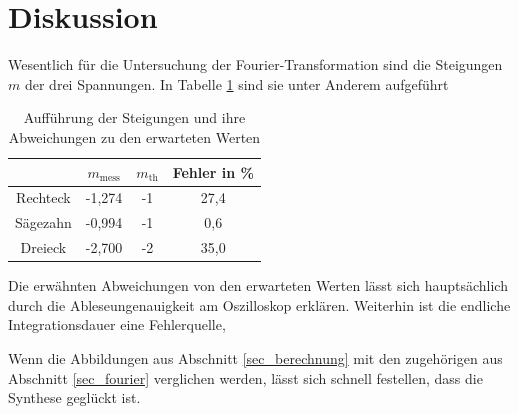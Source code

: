 \section{Diskussion}
Wesentlich für die Untersuchung der Fourier-Transformation sind die Steigungen $m$ der drei Spannungen. In Tabelle \ref{tab_diskus}
sind sie unter Anderem aufgeführt
\begin{table}[H]
 \begin{tabular}{c|c|c|c}
&  	$m_{\text{mess}}$&	$m_{\text{th}}$&	Fehler in \% \\
\hline
Rechteck&	-1,274&	-1&	27,4\\
Sägezahn&	-0,994&	-1&	0,6\\
Dreieck&	-2,700&	-2&	35,0
 \end{tabular}
\caption{Aufführung der Steigungen und ihre Abweichungen zu den erwarteten Werten}
\label{tab_diskus}
\end{table}
Die erwähnten Abweichungen von den erwarteten Werten lässt sich hauptsächlich durch die Ableseungenauigkeit am Oszilloskop erklären. 
Weiterhin ist die endliche Integrationsdauer eine Fehlerquelle, 


Wenn die Abbildungen aus Abschnitt \ref{sec_berechnung} mit den zugehörigen aus Abschnitt \ref{sec_fourier} verglichen werden, lässt
sich schnell festellen, dass die Synthese geglückt ist.







